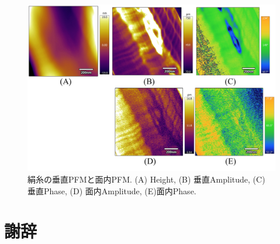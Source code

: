 \documentclass[dvipdfmx,12pt,a4paper]{jreport}
\begin{document}
		\begin{figure}[h]
			\centering
			\includegraphics[width=\linewidth]{PFM_silk_fiber.jpg}
			\caption{絹糸の垂直PFMと面内PFM. (A) Height, (B) 垂直Amplitude, (C) 垂直Phase, 
			(D) 面内Amplitude, (E)面内Phase.}
			\label{silk_fiber_PFM}
		\end{figure}
	\chapter*{謝辞}

\end{document}
